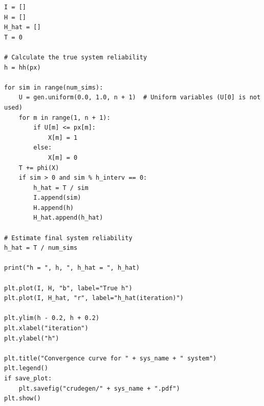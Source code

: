 \documentclass[12pt,
               a4paper,
               article,
               oneside,
               english,oldfontcommands]{memoir}
\begin{document}
\begin{lstlisting}[caption= Crude Monte Carlo Reliability (exercise d.), label={lst:crude rel}]
I = []
H = []
H_hat = []
T = 0

# Calculate the true system reliability
h = hh(px)

for sim in range(num_sims):
    U = gen.uniform(0.0, 1.0, n + 1)  # Uniform variables (U[0] is not used)
    for m in range(1, n + 1):
        if U[m] <= px[m]:
            X[m] = 1
        else:
            X[m] = 0
    T += phi(X)
    if sim > 0 and sim % h_interv == 0:
        h_hat = T / sim
        I.append(sim)
        H.append(h)
        H_hat.append(h_hat)

# Estimate final system reliability
h_hat = T / num_sims

print("h = ", h, ", h_hat = ", h_hat)

plt.plot(I, H, "b", label="True h")
plt.plot(I, H_hat, "r", label="h_hat(iteration)")

plt.ylim(h - 0.2, h + 0.2)
plt.xlabel("iteration")
plt.ylabel("h")

plt.title("Convergence curve for " + sys_name + " system")
plt.legend()
if save_plot:
    plt.savefig("crudegen/" + sys_name + ".pdf")
plt.show()
\end{lstlisting}
\end{document}
